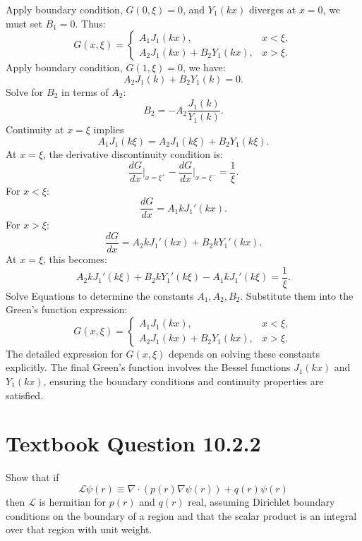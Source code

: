 \documentclass[12pt]{article}
\begin{document}
        Apply boundary condition, \(G(0, \xi) = 0\), and \(Y_1(kx)\) diverges at \(x = 0\), we must set \(B_1 = 0\). Thus:
        \[
        G(x, \xi) =
        \begin{cases} 
        A_1 J_1(kx), & x < \xi, \\
        A_2 J_1(kx) + B_2 Y_1(kx), & x > \xi.
        \end{cases}
        \]
        Apply boundary condition, \(G(1, \xi) = 0\), we have:
        \[
        A_2 J_1(k) + B_2 Y_1(k) = 0.
        \]
        Solve for \(B_2\) in terms of \(A_2\):
        \[
        B_2 = -A_2 \frac{J_1(k)}{Y_1(k)}.
        \]
        Continuity at \(x = \xi\) implies
        \[
        A_1 J_1(k\xi) = A_2 J_1(k\xi) + B_2 Y_1(k\xi).
        \]
        At \(x = \xi\), the derivative discontinuity condition is:
        \[
        \frac{dG}{dx}\Big|_{x=\xi^+} - \frac{dG}{dx}\Big|_{x=\xi^-} = \frac{1}{\xi}.
        \]
        For \(x < \xi\):
        \[
        \frac{dG}{dx} = A_1 k J_1'(kx).
        \]
        For \(x > \xi\):
        \[
        \frac{dG}{dx} = A_2 k J_1'(kx) + B_2 k Y_1'(kx).
        \]
        At \(x = \xi\), this becomes:
        \[
        A_2 k J_1'(k\xi) + B_2 k Y_1'(k\xi) - A_1 k J_1'(k\xi) = \frac{1}{\xi}.
        \]
        Solve Equations to determine the constants \(A_1, A_2, B_2\). Substitute them into the Green's function expression:
        \[
        G(x, \xi) =
        \begin{cases} 
        A_1 J_1(kx), & x < \xi, \\
        A_2 J_1(kx) + B_2 Y_1(kx), & x > \xi.
        \end{cases}
        \]
        The detailed expression for \(G(x, \xi)\) depends on solving these constants explicitly. The final Green's function involves the Bessel functions \(J_1(kx)\) and \(Y_1(kx)\), ensuring the boundary conditions and continuity properties are satisfied.

\section*{Textbook Question 10.2.2}
    Show that if 
    \[
        \mathcal{L} \psi(r) \equiv \nabla \cdot \left( p(r) \nabla \psi(r) \right) + q(r) \psi(r)
    \]
    then $\mathcal{L}$ is hermitian for $p(r)$ and $q(r)$ real, assuming Dirichlet boundary conditions on the boundary of a region and that the scalar product is an integral over that region with unit weight.
   
\end{document}
